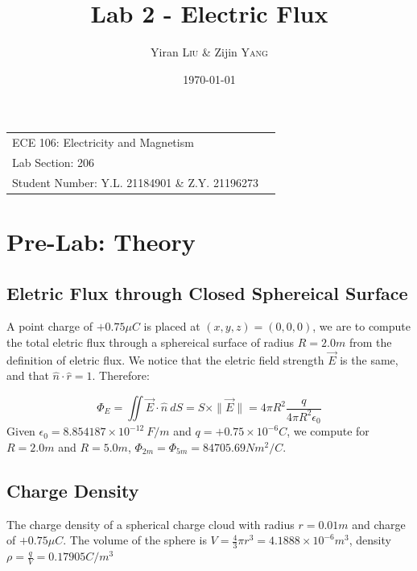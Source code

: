 \documentclass[
	letterpaper, %
	11pt, %
]{CSUniSchoolLabReport}
\title{Lab 2 - Electric Flux} %
\author{Yiran \textsc{Liu} \&  Zijin \textsc{Yang}} %
\date{\today} %
\begin{document}
\maketitle %

\begin{center}
	\begin{tabular}{l r}
      ECE 106: 	Electricity and Magnetism \\
      Lab Section: 206 \\
      Student Number: Y.L. 21184901 \& Z.Y. 21196273
	\end{tabular}
\end{center}

\section{Pre-Lab: Theory}

\subsection{Eletric Flux through Closed Sphereical Surface}

A point charge of $+0.75\mu C$ is placed at $(x, y, z) = (0, 0, 0)$, we are to compute the total eletric flux through a sphereical surface of radius $R=2.0m$ from the definition of eletric flux. We notice that the eletric field strength $\vec{E}$ is the same, and that $\hat{n} \cdot \hat{r} = 1$. Therefore:

\[
  \Phi_E = \iint \vec{E} \cdot \hat{n} \ dS
  = S \times \|\vec{E}\|
  = 4 \pi R^2 \frac{q}{4 \pi R^2 \epsilon_0} 
\]
Given $\epsilon_{0} = 8.854187 \times 10^{-12} \ F / m$ and $q = +0.75 \times 10^{-6} C$, we compute for $R=2.0m$ and $R=5.0m$, $\Phi_{2m} = \Phi_{5m} = 84705.69 Nm^2/C$.

\subsection{Charge Density}

The charge density of a spherical charge cloud with radius $r=0.01m$ and charge of $+0.75\mu C$. The volume of the sphere is $V = \frac{4}{3} \pi r^3 = 4.1888 \times 10^{-6} m^3$, density $\rho=\frac{q}{V} = 0.17905 C/m^3$
\end{document}
